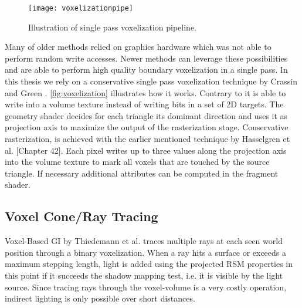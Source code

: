 \documentclass[thesis.tex]{subfiles}
\begin{document}
\begin{figure}[h]
\centering
\texttt{[image: voxelizationpipe]}
\caption{\cite{bib:openglinsightsvoxel} Illustration of single pass voxelization pipeline. }
\label{fig:voxelization}
\end{figure}
Many of older methods relied on graphics hardware which was not able to perform random write accesses.
Newer methods can leverage these possibilities and are able to perform high quality boundary voxelization in a single pass.
In this thesis we rely on a conservative single pass voxelization technique by Crassin and Green \cite{bib:openglinsightsvoxel}.
\autoref{fig:voxelization} illustrates how it works.
Contrary to \cite{bib:eisemann:boundaryvox} it is able to write into a volume texture instead of writing bits in a set of 2D targets.
The geometry shader decides for each triangle its dominant direction and uses it as projection axis to maximize the output of the rasterization stage.
Conservative rasterization, is achieved with the earlier mentioned technique by Hasselgren et al. \cite{bib:GPUGems2}[Chapter 42]. 
Each pixel writes up to three values along the projection axis into the volume texture to mark all voxels that are touched by the source triangle.
If necessary additional attributes can be computed in the fragment shader.

\subsection{Voxel Cone/Ray Tracing} \label{sec:prev:voxelcone}
Voxel-Based GI by Thiedemann et al. \cite{bib:voxelgi} traces multiple rays at each seen world position through a binary voxelization.
When a ray hits a surface or exceeds a maximum stepping length, light is added using the projected RSM properties in this point if it succeeds the shadow mapping test, i.e. it is visible by the light source.
Since tracing rays through the voxel-volume is a very costly operation, indirect lighting is only possible over short distances.
\end{document}
